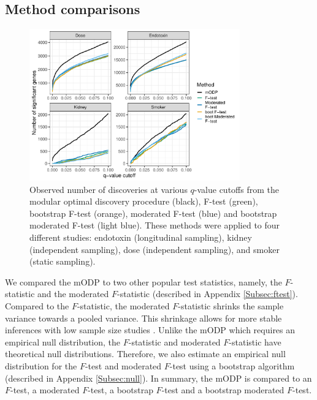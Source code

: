 \documentclass[11pt]{article}
\begin{document}
\subsection{Method comparisons}

\begin{figure}[!t]
\centering
\includegraphics[width = 0.81\textwidth]{../analysis/figures/observed_power.pdf}  
\caption{Observed number of discoveries at various $q$-value cutoffs from the modular optimal discovery procedure (black), F-test (green), bootstrap F-test (orange), moderated F-test (blue) and bootstrap moderated F-test (light blue). These methods were applied to four different studies: endotoxin (longitudinal sampling), kidney (independent sampling), dose (independent sampling), and smoker (static sampling).}
\label{fig:observedDiscoveries}
\end{figure}

We compared the mODP to two other popular test statistics, namely, the $F$-statistic and the moderated $F$-statistic (described in Appendix \ref{Subsec:ftest}). Compared to the $F$-statistic, the moderated $F$-statistic shrinks the sample variance towards a pooled variance. This shrinkage allows for more stable inferences with low sample size studies \citep{smyth2004linear}. Unlike the mODP which requires an empirical null distribution, the $F$-statistic and moderated $F$-statistic have theoretical null distributions. Therefore, we also estimate an empirical null distribution for the $F$-test and moderated $F$-test using a bootstrap algorithm (described in Appendix \ref{Subsec:null}). In summary, the mODP is compared to an $F$-test, a moderated $F$-test, a bootstrap $F$-test and a bootstrap moderated $F$-test.
\end{document}
